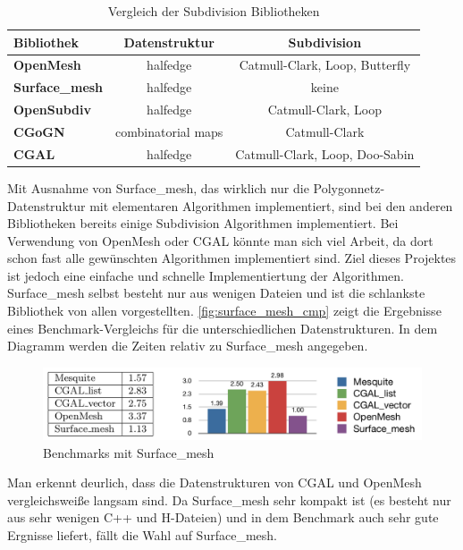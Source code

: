 \begin{table}
\center
\caption{Vergleich der Subdivision Bibliotheken}
\begin{tabular}{l|c|c}
\textbf{Bibliothek} & \textbf{Datenstruktur} & \textbf{Subdivision}\\
\hline
\textbf{OpenMesh} & halfedge & Catmull-Clark, Loop, Butterfly\\
\textbf{Surface\_mesh} & halfedge & keine\\
\textbf{OpenSubdiv} & halfedge & Catmull-Clark, Loop\\
\textbf{CGoGN} & combinatorial maps & Catmull-Clark\\
\textbf{\acs{CGAL}} & halfedge & Catmull-Clark, Loop, Doo-Sabin\\
\end{tabular}
\label{tab:sd_bib}
\end{table}

Mit Ausnahme von Surface\_mesh, das wirklich nur die Polygonnetz-Datenstruktur mit elementaren Algorithmen implementiert, sind bei den anderen Bibliotheken bereits
einige Subdivision Algorithmen implementiert.
Bei Verwendung von OpenMesh oder CGAL könnte man sich viel Arbeit, da dort schon fast alle gewünschten Algorithmen implementiert sind.
Ziel dieses Projektes ist jedoch eine einfache und schnelle Implementiertung der Algorithmen.
Surface\_mesh selbst besteht nur aus wenigen Dateien und ist die schlankste Bibliothek von allen vorgestellten.
\autoref{fig:surface_mesh_cmp} zeigt die Ergebnisse eines Benchmark-Vergleichs für die unterschiedlichen Datenstrukturen.
In dem Diagramm werden die Zeiten relativ zu Surface\_mesh angegeben.

\begin{figure}
  \centering
  \includegraphics[width=1.0\textwidth]{content/media/surface_mesh_cmp}
   \caption{Benchmarks mit Surface\_mesh \cite{Sieger.}}
  \label{fig:surface_mesh_cmp}
\end{figure}

Man erkennt deurlich, dass die Datenstrukturen von \acs{CGAL} und OpenMesh vergleichsweiße langsam sind.
Da Surface\_mesh sehr kompakt ist (es besteht nur aus sehr wenigen C++ und H-Dateien) und in dem Benchmark
auch sehr gute Ergnisse liefert, fällt die Wahl auf Surface\_mesh.


